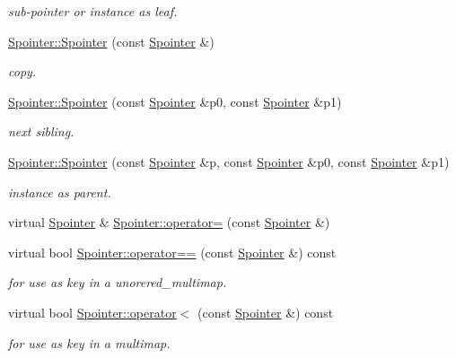 \begin{DoxyCompactItemize}
\begin{DoxyCompactList}\small\item\em sub-\/pointer or instance as leaf. \end{DoxyCompactList}\item 
\mbox{\label{group__table_gaf40e1a1f0edc608d4413f096a19aae78}} 
\mbox{\hyperlink{group__table_gaf40e1a1f0edc608d4413f096a19aae78}{Spointer\+::\+Spointer}} (const \mbox{\hyperlink{classSpointer}{Spointer}} \&)
\begin{DoxyCompactList}\small\item\em copy. \end{DoxyCompactList}\item 
\mbox{\hyperlink{group__table_gac303715911a48c482acb6ae4188508d3}{Spointer\+::\+Spointer}} (const \mbox{\hyperlink{classSpointer}{Spointer}} \&p0, const \mbox{\hyperlink{classSpointer}{Spointer}} \&p1)
\begin{DoxyCompactList}\small\item\em next sibling. \end{DoxyCompactList}\item 
\mbox{\hyperlink{group__table_gad078973f8318ccf5800db79e87584dcc}{Spointer\+::\+Spointer}} (const \mbox{\hyperlink{classSpointer}{Spointer}} \&p, const \mbox{\hyperlink{classSpointer}{Spointer}} \&p0, const \mbox{\hyperlink{classSpointer}{Spointer}} \&p1)
\begin{DoxyCompactList}\small\item\em instance as parent. \end{DoxyCompactList}\item 
virtual \mbox{\hyperlink{classSpointer}{Spointer}} \& \mbox{\hyperlink{group__table_ga88eb3c521aa1c9bc9b8891f20b9a01eb}{Spointer\+::operator=}} (const \mbox{\hyperlink{classSpointer}{Spointer}} \&)
\item 
virtual bool \mbox{\hyperlink{group__table_gacb9d4d8e3da8a1e082b80fd31abb9772}{Spointer\+::operator==}} (const \mbox{\hyperlink{classSpointer}{Spointer}} \&) const
\begin{DoxyCompactList}\small\item\em for use as key in a unorered\+\_\+multimap. \end{DoxyCompactList}\item 
virtual bool \mbox{\hyperlink{group__table_ga797b376c9ed1b4777ea94ff8350c65c8}{Spointer\+::operator$<$}} (const \mbox{\hyperlink{classSpointer}{Spointer}} \&) const
\begin{DoxyCompactList}\small\item\em for use as key in a multimap. \end{DoxyCompactList}\item 

\end{DoxyCompactItemize}
